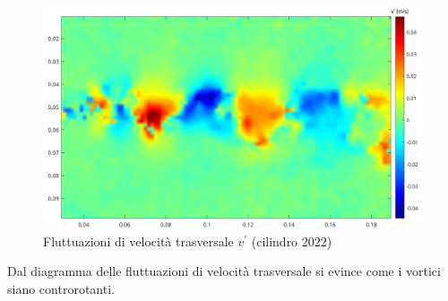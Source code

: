 \begin{figure}[H]
    \centering
    \includegraphics[width=.97\textwidth]{images/11/fluttv.png}
    \caption{Fluttuazioni di velocità trasversale $v^\prime$ (cilindro 2022)}
\end{figure}

\noindent Dal diagramma delle fluttuazioni di velocità trasversale si evince come i vortici siano controrotanti.

\newpage
